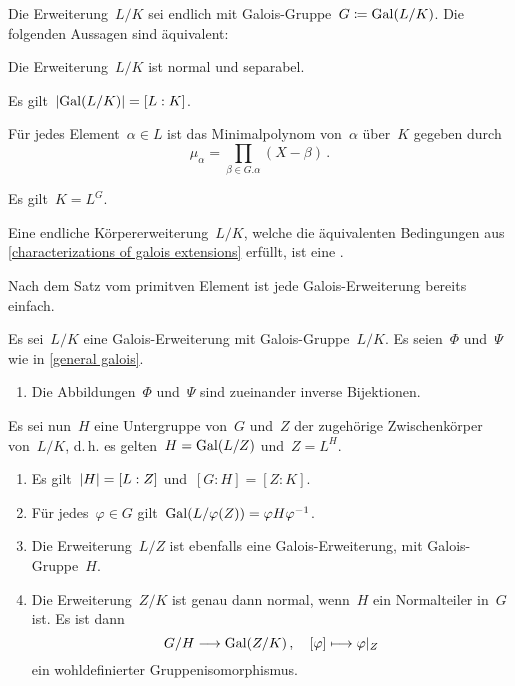 \begin{proposition}
  \label{characterizations of galois extensions}
  Die Erweiterung~$L/K$ sei endlich mit Galois-Gruppe~$G \coloneqq \operatorname{Gal}(L/K)$.
  Die folgenden Aussagen sind äquivalent:
  \begin{equivlist}
    \item
      Die Erweiterung~$L/K$ ist normal und separabel.
    \item
      Es gilt~$\lvert \operatorname{Gal}(L/K) \rvert = [L : K]$.
    \item
      Für jedes Element~$\alpha \in L$ ist das Minimalpolynom von~$\alpha$ über~$K$ gegeben durch
      \[
        \mu_\alpha
        =
        \prod_{\beta \in G.\alpha}
        (X - \beta) \,.
      \]
    \item
      Es gilt~$K = L^G$.
  \end{equivlist}
\end{proposition}

\begin{definition}
  Eine endliche Körpererweiterung~$L/K$, welche die äquivalenten Bedingungen aus \cref{characterizations of galois extensions} erfüllt, ist eine .
\end{definition}

\begin{remark}
  Nach dem Satz vom primitven Element ist jede Galois-Erweiterung bereits einfach.
\end{remark}

\begin{theorem}
  Es sei~$L/K$ eine Galois-\hspace{0pt}Erweiterung mit Galois-Gruppe~$L/K$.
  Es seien~$\Phi$ und~$\Psi$ wie in \cref{general galois}.
  \begin{enumerate}
    \item
      Die Abbildungen~$\Phi$ und~$\Psi$ sind zueinander inverse Bijektionen.
  \end{enumerate}
  Es sei nun~$H$ eine Untergruppe von~$G$ und~$Z$ der zugehörige Zwischenkörper von~$L/K$, d.\,h. es gelten~$H = \operatorname{Gal}(L/Z)$ und~$Z = L^H$.
  \begin{enumerate}[resume*]
    \item
      Es gilt~$\lvert H\rvert = [L : Z]$ und~$[G : H] = [Z : K]$.
    \item
      Für jedes~$\varphi \in G$ gilt~$\operatorname{Gal}(L / \varphi(Z)) = \varphi H \varphi^{-1}$.
    \item
      Die Erweiterung~$L/Z$ ist ebenfalls eine Galois-Erweiterung, mit Galois-Gruppe~$H$.
    \item
      Die Erweiterung~$Z/K$ ist genau dann normal, wenn~$H$ ein Normalteiler in~$G$ ist.
      Es ist dann
      \[
        G / H
        \to
        \Gal(Z/K) \,,
        \quad
        \class{\varphi}
        \mapsto
        \restrict{\varphi}{Z}
      \]
      ein wohldefinierter Gruppenisomorphismus.
  \end{enumerate}
\end{theorem}





